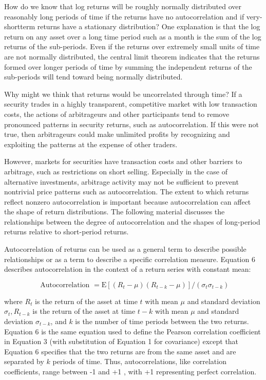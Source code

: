 \documentclass[11pt]{article}
\begin{document}
How do we know that log returns will be roughly normally distributed over reasonably long periods of time if the returns have no autocorrelation and if very-shortterm returns have a stationary distribution? One explanation is that the log return on any asset over a long time period such as a month is the sum of the log returns of the sub-periods. Even if the returns over extremely small units of time are not normally distributed, the central limit theorem indicates that the returns formed over longer periods of time by summing the independent returns of the sub-periods will tend toward being normally distributed.

Why might we think that returns would be uncorrelated through time? If a security trades in a highly transparent, competitive market with low transaction costs, the actions of arbitrageurs and other participants tend to remove pronounced patterns in security returns, such as autocorrelation. If this were not true, then arbitrageurs could make unlimited profits by recognizing and exploiting the patterns at the expense of other traders.

However, markets for securities have transaction costs and other barriers to arbitrage, such as restrictions on short selling. Especially in the case of alternative investments, arbitrage activity may not be sufficient to prevent nontrivial price patterns such as autocorrelation. The extent to which returns reflect nonzero autocorrelation is important because autocorrelation can affect the shape of return distributions. The following material discusses the relationships between the degree of autocorrelation and the shapes of long-period returns relative to short-period returns.

Autocorrelation of returns can be used as a general term to describe possible relationships or as a term to describe a specific correlation measure. Equation 6 describes autocorrelation in the context of a return series with constant mean:


\begin{equation*}
\text { Autocorrelation }=\mathrm{E}\left[\left(R_{t}-\mu\right)\left(R_{t-k}-\mu\right)\right] /\left(\sigma_{t} \sigma_{t-k}\right) \tag{6}
\end{equation*}


where $R_{t}$ is the return of the asset at time $t$ with mean $\mu$ and standard deviation $\sigma_{t}, R_{t-k}$ is the return of the asset at time $t-k$ with mean $\mu$ and standard deviation $\sigma_{t-k}$, and $k$ is the number of time periods between the two returns. Equation 6 is the same equation used to define the Pearson correlation coefficient in Equation 3 (with substitution of Equation 1 for covariance) except that Equation 6 specifies that the two returns are from the same asset and are separated by $k$ periods of time. Thus, autocorrelations, like correlation coefficients, range between -1 and +1 , with +1 representing perfect correlation.
\end{document}
